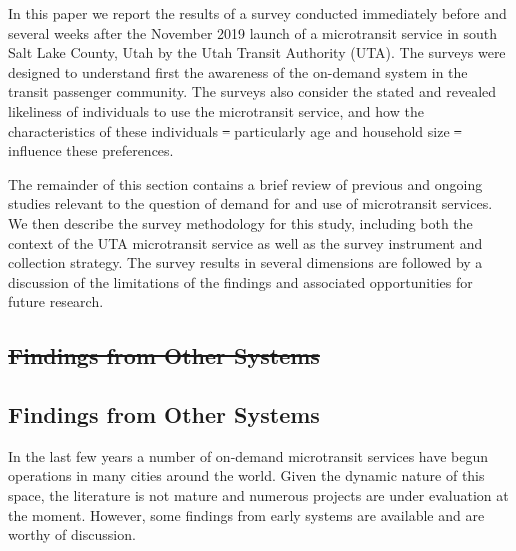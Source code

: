 \documentclass[smartcities,article,submit,moreauthors,pdftex]{mdpi} %
\providecommand{\DIFadd}[1]{{\protect\color{blue}\uwave{#1}}} %
\providecommand{\DIFdel}[1]{{\protect\color{red}\sout{#1}}}                      %
\providecommand{\DIFaddbegin}{} %
\providecommand{\DIFaddend}{} %
\providecommand{\DIFdelbegin}{} %
\providecommand{\DIFdelend}{} %
\begin{document}
In this paper we report the results of a survey conducted immediately before and
several weeks after the November 2019 launch of a microtransit service in south
Salt Lake County, Utah by the Utah Transit Authority (UTA). The surveys were
designed to understand first the awareness of the on-demand system in the
transit passenger community. The surveys also consider the stated and revealed
likeliness of individuals to use the microtransit service, and how the
characteristics of these individuals \DIFdelbegin \DIFdel{– }\DIFdelend \DIFaddbegin \DIFadd{-- }\DIFaddend particularly age and household size \DIFdelbegin \DIFdel{– }\DIFdelend \DIFaddbegin \DIFadd{--
}\DIFaddend influence these preferences.

The remainder of this section contains a brief review of previous and ongoing
studies relevant to the question of demand for and use of microtransit services.
We then describe the survey methodology for this study, including both the
context of the UTA microtransit service as well as the survey instrument and
collection strategy. The survey results in several dimensions are followed by a
discussion of the limitations of the findings and associated opportunities for
future research.

\DIFdelbegin \subsection{\DIFdel{Findings from Other Systems}}
\addtocounter{subsection}{-1}%
\DIFdelend \DIFaddbegin \hypertarget{findings-from-other-systems}{%
\subsection{Findings from Other Systems}\label{findings-from-other-systems}}

\DIFaddend In the last few years a number of on-demand microtransit services have begun
operations in many cities around the world. Given the dynamic nature of this
space, the literature is not mature and numerous projects are under evaluation
at the moment. However, some findings from early systems are available and are
worthy of discussion.
\end{document}
